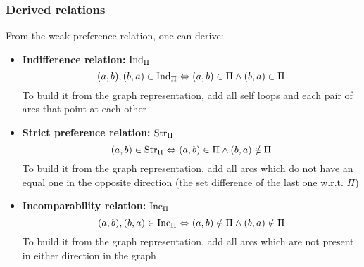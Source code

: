 \subsubsection{Derived relations}

From the weak preference relation, one can derive: 
\begin{itemize}
	\item \textbf{Indifference relation:} $\text{Ind}_{\Pi}$
	$$ (a,b),(b,a) \in \text{Ind}_{\Pi} \Leftrightarrow (a,b) \in \Pi \wedge (b,a) \in \Pi $$
	To build it from the graph representation, add all self loops and each pair of arcs that point at each other
	
	\item \textbf{Strict preference relation:} $\text{Str}_{\Pi}$
	$$ (a,b) \in \text{Str}_{\Pi} \Leftrightarrow (a,b) \in \Pi \wedge (b,a) \notin \Pi $$
	To build it from the graph representation, add all arcs which do not have an equal one in the opposite direction (the set difference of the last one w.r.t. $\Pi$)
	
	\item \textbf{Incomparability relation:} $\text{Inc}_{\Pi}$
	$$ (a,b), (b,a) \in \text{Inc}_{\Pi} \Leftrightarrow (a,b) \notin \Pi \wedge (b,a) \notin \Pi $$
	To build it from the graph representation, add all arcs which are not present in either direction in the graph
\end{itemize}